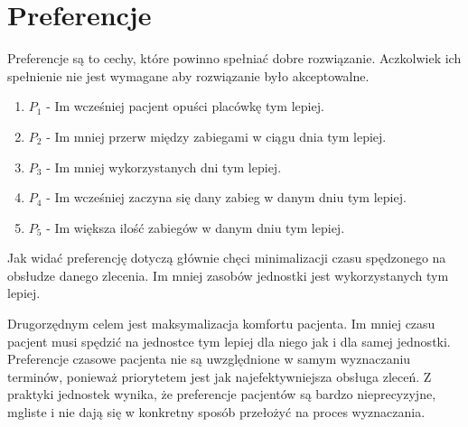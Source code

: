 \section{Preferencje}
Preferencje są to cechy, które powinno spełniać dobre rozwiązanie.
Aczkolwiek ich spełnienie nie jest wymagane aby rozwiązanie było akceptowalne.
\begin{enumerate}
	\item{$P_1$ - Im wcześniej pacjent opuści placówkę tym lepiej. }
	\item{$P_2$ - Im mniej przerw między zabiegami w ciągu dnia tym lepiej.}
	\item{$P_3$ - Im mniej wykorzystanych dni tym lepiej.}
	\item{$P_4$ - Im wcześniej zaczyna się dany zabieg w danym dniu tym lepiej.}
	\item{$P_5$ - Im większa ilość zabiegów w danym dniu tym lepiej.}
\end{enumerate}

Jak widać preferencję dotyczą głównie chęci minimalizacji czasu spędzonego na
obsłudze danego zlecenia. Im mniej zasobów jednostki jest wykorzystanych tym
lepiej.

Drugorzędnym celem jest maksymalizacja komfortu pacjenta. Im mniej czasu pacjent
musi spędzić na jednostce tym lepiej dla niego jak i dla samej jednostki.
Preferencje czasowe pacjenta nie są uwzględnione w samym wyznaczaniu terminów,
ponieważ priorytetem jest jak najefektywniejsza obsługa zleceń. Z praktyki
jednostek wynika, że preferencje pacjentów są bardzo nieprecyzyjne, mgliste i
nie dają się w konkretny sposób przełożyć na proces wyznaczania.
